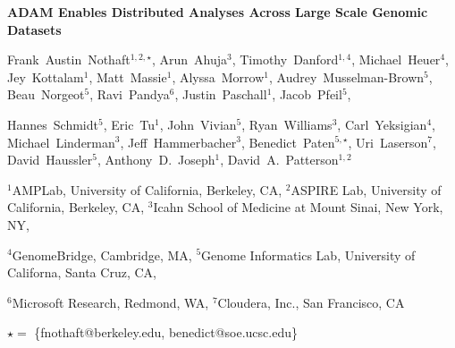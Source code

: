 \documentclass[11pt]{a0poster}
\date{}
\begin{document}
\begin{minipage}{0.887\linewidth}
\vspace{75pt}
\hspace{92pt}
\color{Blue}
{\fontsize{2.5cm}{1em} \textbf{ADAM Enables Distributed Analyses Across Large Scale Genomic Datasets}}

\hspace{92pt}
\fontsize{1cm}{1em}
Frank~Austin~Nothaft$^{1,2,\star}$, Arun~Ahuja$^3$, Timothy~Danford$^{1,4}$, Michael~Heuer$^4$,
Jey~Kottalam$^1$, Matt~Massie$^1$, Alyssa~Morrow$^1$, Audrey~Musselman-Brown$^5$, Beau~Norgeot$^5$,
Ravi~Pandya$^6$, Justin~Paschall$^1$, Jacob~Pfeil$^5$,

\hspace{100pt} Hannes~Schmidt$^5$, Eric~Tu$^1$, John~Vivian$^5$, Ryan~Williams$^3$,
Carl~Yeksigian$^4$, Michael~Linderman$^3$, Jeff~Hammerbacher$^3$,
Benedict~Paten$^{5,\star}$, Uri~Laserson$^7$, David~Haussler$^5$,
Anthony~D.~Joseph$^1$, David~A.~Patterson$^{1,2}$

\hspace{100pt}
$^1$AMPLab, University of California, Berkeley, CA,
$^2$ASPIRE Lab, University of California, Berkeley, CA,
$^3$Icahn School of Medicine at Mount Sinai, New York, NY,

\hspace{100pt}
$^4$GenomeBridge, Cambridge, MA,
$^5$Genome Informatics Lab, University of Californa, Santa Cruz, CA,

\hspace{100pt}
$^6$Microsoft Research, Redmond, WA,
$^7$Cloudera, Inc., San Francisco, CA

\hspace{100pt}
\fontsize{1cm}{1em}
$\star =$ \{fnothaft@berkeley.edu, benedict@soe.ucsc.edu\}
\vspace{75pt}
\end{minipage}
\end{document}
